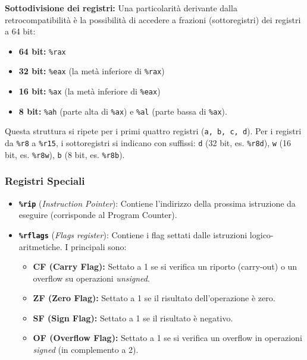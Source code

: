 \documentclass[12pt, a4paper]{article}
\begin{document}
\textbf{Sottodivisione dei registri:}
Una particolarità derivante dalla retrocompatibilità è la possibilità di accedere a frazioni (sottoregistri) dei registri a 64 bit:
\begin{itemize}
    \item \textbf{64 bit:} \texttt{\%rax}
    \item \textbf{32 bit:} \texttt{\%eax} (la metà inferiore di \texttt{\%rax})
    \item \textbf{16 bit:} \texttt{\%ax} (la metà inferiore di \texttt{\%eax})
    \item \textbf{8 bit:} \texttt{\%ah} (parte alta di \texttt{\%ax}) e \texttt{\%al} (parte bassa di \texttt{\%ax}).
\end{itemize}
Questa struttura si ripete per i primi quattro registri (\texttt{a, b, c, d}). Per i registri da \texttt{\%r8} a \texttt{\%r15}, i sottoregistri si indicano con suffissi: \texttt{d} (32 bit, es. \texttt{\%r8d}), \texttt{w} (16 bit, es. \texttt{\%r8w}), \texttt{b} (8 bit, es. \texttt{\%r8b}).

\subsubsection{Registri Speciali}
\begin{itemize}
    \item \texttt{\textbf{\%rip}} (\textit{Instruction Pointer}): Contiene l'indirizzo della prossima istruzione da eseguire (corrisponde al Program Counter).
    \item \texttt{\textbf{\%rflags}} (\textit{Flags register}): Contiene i flag settati dalle istruzioni logico-aritmetiche. I principali sono:
    \begin{itemize}
        \item \textbf{CF (Carry Flag):} Settato a 1 se si verifica un riporto (carry-out) o un overflow su operazioni \textit{unsigned}.
        \item \textbf{ZF (Zero Flag):} Settato a 1 se il risultato dell'operazione è zero.
        \item \textbf{SF (Sign Flag):} Settato a 1 se il risultato è negativo.
        \item \textbf{OF (Overflow Flag):} Settato a 1 se si verifica un overflow in operazioni \textit{signed} (in complemento a 2).
    \end{itemize}
\end{itemize}
\end{document}
